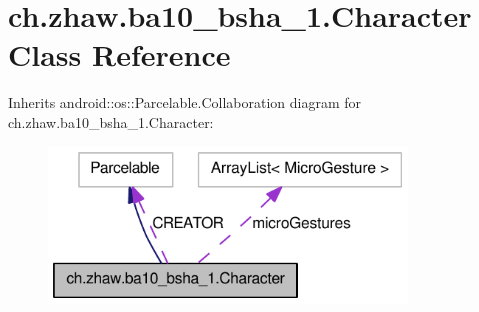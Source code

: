 \hypertarget{classch_1_1zhaw_1_1ba10__bsha__1_1_1Character}{
\section{ch.zhaw.ba10\_\-bsha\_\-1.Character Class Reference}
\label{classch_1_1zhaw_1_1ba10__bsha__1_1_1Character}
}


Inherits android::os::Parcelable.Collaboration diagram for ch.zhaw.ba10\_\-bsha\_\-1.Character:\nopagebreak
\begin{figure}[H]
\begin{center}
\leavevmode
\includegraphics[width=270pt]{classch_1_1zhaw_1_1ba10__bsha__1_1_1Character__coll__graph}
\end{center}
\end{figure}
